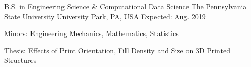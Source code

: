 
\vspace{-.5em}
\begin{cventries}
	
	\cventry
	{B.S. in Engineering Science \& Computational Data Science} %
	{The Pennsylvania State University} %
	{University Park, PA, USA} %
	{Expected: Aug. 2019} %
	{
		\begin{cvitems} %
			\item {Minors: Engineering Mechanics, Mathematics, Statistics}
			\item {Thesis: Effects of Print Orientation, Fill Density and Size on 3D Printed Structures}
		\end{cvitems}
	}
	
\end{cventries}